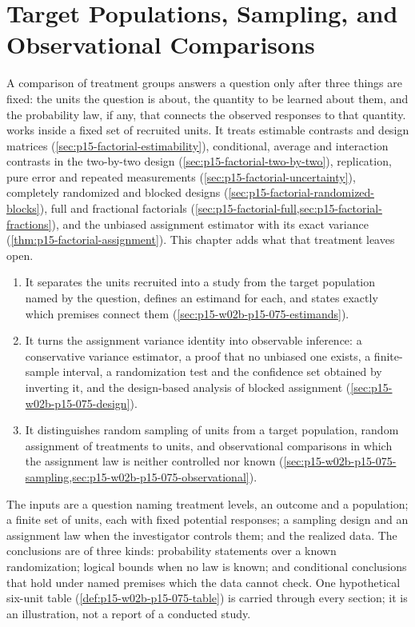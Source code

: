 \chapter{Target Populations, Sampling, and Observational Comparisons}
\label{sec:p15-w02b-p15-075}

A comparison of treatment groups answers a question only after three things
are fixed: the units the question is about, the quantity to be learned about
them, and the probability law, if any, that connects the observed responses
to that quantity.  works inside a fixed set
of recruited units. It treats estimable contrasts and design matrices
(\cref{sec:p15-factorial-estimability}), conditional, average and interaction
contrasts in the two-by-two design (\cref{sec:p15-factorial-two-by-two}),
replication, pure error and repeated measurements
(\cref{sec:p15-factorial-uncertainty}), completely randomized and blocked
designs (\cref{sec:p15-factorial-randomized-blocks}), full and fractional
factorials (\cref{sec:p15-factorial-full,sec:p15-factorial-fractions}), and
the unbiased assignment estimator with its exact variance
(\cref{thm:p15-factorial-assignment}). This chapter adds what that treatment
leaves open.

\begin{enumerate}
\item It separates the units recruited into a study from the target population
named by the question, defines an estimand for each, and states exactly which
premises connect them (\cref{sec:p15-w02b-p15-075-estimands}).
\item It turns the assignment variance identity into observable inference: a
conservative variance estimator, a proof that no unbiased one exists, a
finite-sample interval, a randomization test and the confidence set obtained by
inverting it, and the design-based analysis of blocked assignment
(\cref{sec:p15-w02b-p15-075-design}).
\item It distinguishes random sampling of units from a target population,
random assignment of treatments to units, and observational comparisons in
which the assignment law is neither controlled nor known
(\cref{sec:p15-w02b-p15-075-sampling,sec:p15-w02b-p15-075-observational}).
\end{enumerate}

The inputs are a question naming treatment levels, an outcome and a population;
a finite set of units, each with fixed potential responses; a sampling design
and an assignment law when the investigator controls them; and the realized
data. The conclusions are of three kinds: probability statements over a
known randomization; logical bounds when no law is known; and conditional
conclusions that hold under named premises which the data cannot check. One
hypothetical six-unit table (\cref{def:p15-w02b-p15-075-table}) is carried
through every section; it is an illustration, not a report of a conducted
study.

